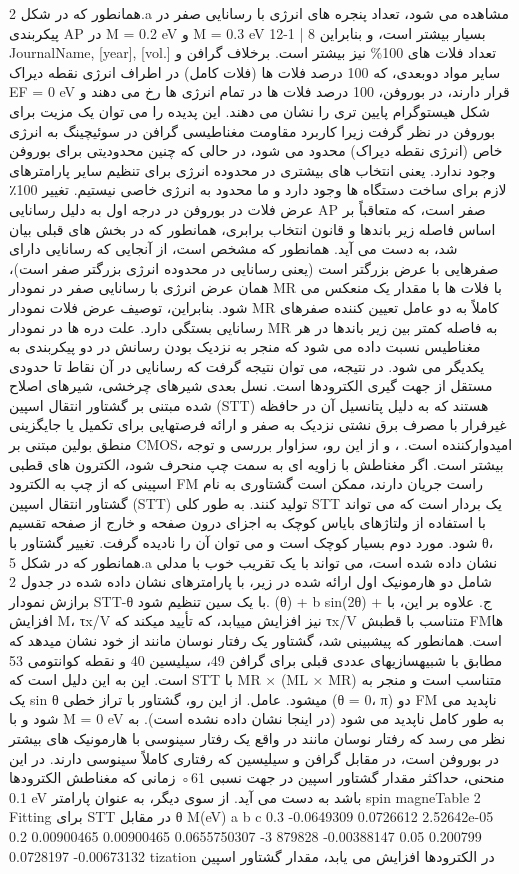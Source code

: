 همانطور که در شکل 2.a مشاهده می شود، تعداد پنجره های انرژی با رسانایی صفر در پیکربندی AP در M = 0.2 eV و M = 0.3 eV بسیار بیشتر است، و بنابراین 8 | 1-12 JournalName, [year], [vol.] تعداد فلات های 100\% نیز بیشتر است. برخلاف گرافن و سایر مواد دوبعدی، که 100 درصد فلات ها (فلات کامل) در اطراف انرژی نقطه دیراک EF = 0 eV قرار دارند، در بوروفن، 100 درصد فلات ها در تمام انرژی ها رخ می دهند و شکل هیستوگرام پایین تری را نشان می دهند. این پدیده را می توان یک مزیت برای بوروفن در نظر گرفت زیرا کاربرد مقاومت مغناطیسی گرافن در سوئیچینگ به انرژی خاص (انرژی نقطه دیراک) محدود می شود، در حالی که چنین محدودیتی برای بوروفن وجود ندارد. یعنی انتخاب های بیشتری در محدوده انرژی برای تنظیم سایر پارامترهای لازم برای ساخت دستگاه ها وجود دارد و ما محدود به انرژی خاصی نیستیم. تغییر 100٪ عرض فلات در بوروفن در درجه اول به دلیل رسانایی AP صفر است، که متعاقباً بر اساس فاصله زیر باندها و قانون انتخاب برابری، همانطور که در بخش های قبلی بیان شد، به دست می آید. همانطور که مشخص است، از آنجایی که رسانایی دارای صفرهایی با عرض بزرگتر است (یعنی رسانایی در محدوده انرژی بزرگتر صفر است)، همان عرض انرژی با رسانایی صفر در نمودار MR با فلات ها با مقدار یک منعکس می شود. بنابراین، توصیف عرض فلات نمودار MR کاملاً به دو عامل تعیین کننده صفرهای رسانایی بستگی دارد. علت دره ها در نمودار MR به فاصله کمتر بین زیر باندها در هر مغناطیس نسبت داده می شود که منجر به نزدیک بودن رسانش در دو پیکربندی به یکدیگر می شود. در نتیجه، می توان نتیجه گرفت که رسانایی در آن نقاط تا حدودی مستقل از جهت گیری الکترودها است. نسل بعدی شیرهای چرخشی، شیرهای اصلاح شده مبتنی بر گشتاور انتقال اسپین (STT) هستند که به دلیل پتانسیل آن در حافظه غیرفرار با مصرف برق نشتی نزدیک به صفر و ارائه فرصتهایی برای تکمیل یا جایگزینی منطق بولین مبتنی بر CMOS، امیدوارکننده است. ، و از این رو، سزاوار بررسی و توجه بیشتر است. اگر مغناطش با زاویه ای به سمت چپ منحرف شود، الکترون های قطبی اسپینی که از چپ به الکترود FM راست جریان دارند، ممکن است گشتاوری به نام گشتاور انتقال اسپین (STT) تولید کنند. به طور کلی STT یک بردار است که می تواند با استفاده از ولتاژهای بایاس کوچک به اجزای درون صفحه و خارج از صفحه تقسیم شود. مورد دوم بسیار کوچک است و می توان آن را نادیده گرفت. تغییر گشتاور با θ، همانطور که در شکل 5.a نشان داده شده است، می تواند با یک تقریب خوب با مدلی شامل دو هارمونیک اول ارائه شده در زیر، با پارامترهای نشان داده شده در جدول 2 برازش نمودار STT-θ با یک سین تنظیم شود. (θ) + b sin(2θ) + ج. علاوه بر این، با افزایش M، τx/V نیز افزایش مییابد، که تأیید میکند که τx/V متناسب با قطبش FMها است. همانطور که پیشبینی شد، گشتاور یک رفتار نوسان مانند از خود نشان میدهد که مطابق با شبیهسازیهای عددی قبلی برای گرافن 49، سیلیسین 40 و نقطه کوانتومی 53 است. این به این دلیل است که STT با MR × (ML × MR) متناسب است و منجر به یک sin θ میشود. عامل. از این رو، گشتاور با تراز خطی (θ = 0، π) دو FM ناپدید می شود و با M = 0 eV به طور کامل ناپدید می شود (در اینجا نشان داده نشده است). به نظر می رسد که رفتار نوسان مانند در واقع یک رفتار سینوسی با هارمونیک های بیشتر در بوروفن است، در مقابل گرافن و سیلیسین که رفتاری کاملاً سینوسی دارند. در این منحنی، حداکثر مقدار گشتاور اسپین در جهت نسبی 61◦ زمانی که مغناطش الکترودها 0.1 eV باشد به دست می آید. از سوی دیگر، به عنوان پارامتر spin magneTable 2 Fitting برای STT در مقابل θ M(eV) a b c 0.3 -0.0649309 0.0726612 2.52642e-05 0.2 0.00900465 0.00900465 0.0655750307 -3 879828 -0.00388147 0.05 0.200799 0.0728197 -0.00673132 tization در الکترودها افزایش می یابد، مقدار گشتاور اسپین 